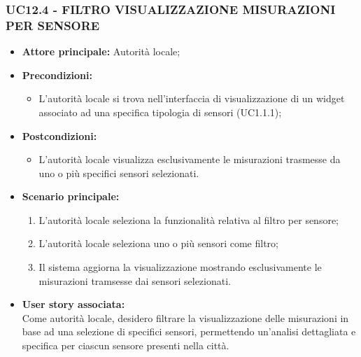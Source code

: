 \subsubsection{UC12.4 - FILTRO VISUALIZZAZIONE MISURAZIONI PER SENSORE}
\begin{itemize}
    \item \textbf{Attore principale:} Autorità locale;
    \item \textbf{Precondizioni:}
        \begin{itemize}
            \item L'autorità locale si trova nell'interfaccia di visualizzazione di un widget associato ad una specifica tipologia di sensori (UC1.1.1);
        \end{itemize}
    \item \textbf{Postcondizioni:}
        \begin{itemize}
            \item L'autorità locale visualizza esclusivamente le misurazioni trasmesse da uno o più specifici sensori selezionati.
        \end{itemize}
    \item \textbf{Scenario principale:}
        \begin{enumerate}
            \item L'autorità locale seleziona la funzionalità relativa al filtro per sensore;
            \item L'autorità locale seleziona uno o più sensori come filtro;
            \item Il sistema aggiorna la visualizzazione mostrando esclusivamente le misurazioni tramsesse dai sensori selezionati.
        \end{enumerate}
    \item \textbf{User story associata:} \\
        Come autorità locale, desidero filtrare la visualizzazione delle misurazioni in base ad una selezione di specifici sensori, permettendo un'analisi dettagliata e specifica per ciascun sensore presenti nella città.
\end{itemize}
